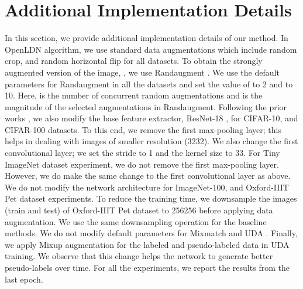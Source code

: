 \documentclass[runningheads]{eccv2022submission}
\begin{document}
\section{Additional Implementation Details}
\label{sec:implementation}
In this section, we provide additional implementation details of our method. In OpenLDN algorithm, we use standard data augmentations which include random crop, and random horizontal flip for all datasets. To obtain the strongly augmented version of the image, , we use Randaugment \cite{cubuk2020randaugment}. We use the default parameters for Randaugment in all the datasets and set the value of  to 2 and  to 10. Here,  is the number of concurrent random augmentations and  is the magnitude of the selected augmentations in Randaugment. Following the prior works \cite{Han2020Automatically,cao2022openworld}, we also modify the base feature extractor, ResNet-18 \cite{he2016deep}, for CIFAR-10, and CIFAR-100 datasets. To this end, we remove the first max-pooling layer; this helps in dealing with images of smaller resolution (3232). We also change the first convolutional layer; we set the stride to 1 and the kernel size to 33. For Tiny ImageNet dataset experiment, we do not remove the first max-pooling layer. However, we do make the same change to the first convolutional layer as above. We do not modify the network architecture for ImageNet-100, and Oxford-IIIT Pet dataset experiments. To reduce the training time, we downsample the images (train and test) of Oxford-IIIT Pet dataset to 256256 before applying data augmentation. We use the same downsampling operation for the baseline methods. We do not modify default parameters for Mixmatch \cite{NIPS2019_8749_MixMatch} and UDA \cite{xie2019unsupervised}. Finally, we apply Mixup \cite{zhang2018mixup} augmentation for the labeled and pseudo-labeled data in UDA training. We observe that this change helps the network to generate better pseudo-labels over time. For all the experiments, we report the results from the last epoch.          
      
\end{document}
